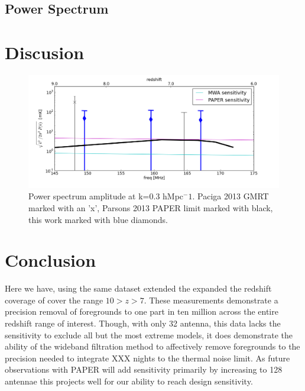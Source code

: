 \documentclass[preprint]{aastex}
\begin{document}

\subsection{Power Spectrum}


\section{Discusion}

\begin{figure}
\includegraphics[width=\textwidth]{figures/psa32_pspec_k3pk_vs_z.png}
\caption{Power spectrum amplitude at k=0.3 hMpc$^-1$.  Paciga 2013 GMRT marked with an 'x', Parsons 2013 PAPER limit marked with black, this work marked with blue diamonds.}
\end{figure}

\section{Conclusion}

Here we have, using the same dataset extended the expanded the redshift coverage of \cite{Parsons:2013p9876} cover the range $10>z>7$.  These measurements demonstrate a precision removal of foregrounds to one part in ten million across the entire redshift range of interest. Though, with only 32 antenna, this data lacks the sensitivity to exclude all but the most extreme models, it does demonstrate the ability of the wideband filtration method to affectively remove foregrounds to the precision needed to integrate XXX nights to the thermal noise limit.  As future observations with PAPER  will add sensitivity primarily by increasing to 128 antennae this projects well for our ability to reach design sensitivity. 
\end{document}
